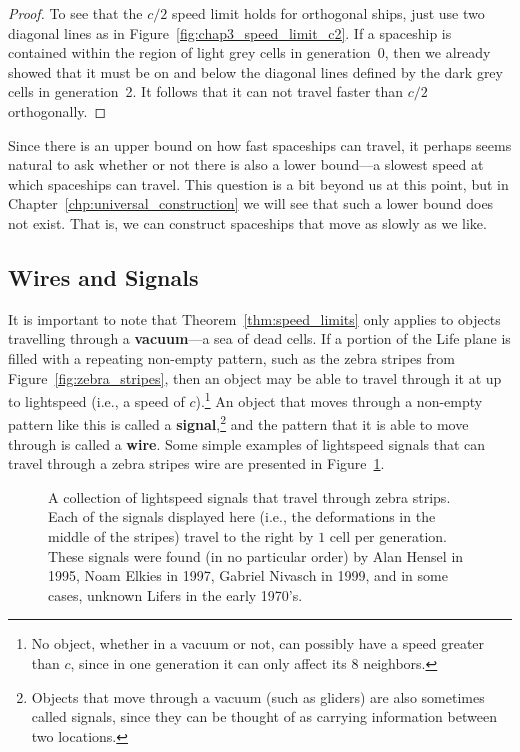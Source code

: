 \begin{proof}
	To see that the $c/2$ speed limit holds for orthogonal ships, just use two diagonal lines as in Figure~\ref{fig:chap3_speed_limit_c2}. If a spaceship is contained within the region of light grey cells in generation~0, then we already showed that it must be on and below the diagonal lines defined by the dark grey cells in generation~2. It follows that it can not travel faster than $c/2$ orthogonally.
\end{proof}

Since there is an upper bound on how fast spaceships can travel, it perhaps seems natural to ask whether or not there is also a lower bound---a slowest speed at which spaceships can travel. This question is a bit beyond us at this point, but in Chapter~\ref{chp:universal_construction} we will see that such a lower bound does not exist. That is, we can construct spaceships that move as slowly as we like.


\subsection{Wires and Signals}\label{sec:wires_signals}

It is important to note that Theorem~\ref{thm:speed_limits} only applies to objects travelling through a \textbf{vacuum}---a sea of dead cells. If a portion of the Life plane is filled with a repeating non-empty pattern, such as the zebra stripes from Figure~\ref{fig:zebra_stripes}, then an object may be able to travel through it at up to lightspeed (i.e., a speed of $c$).\footnote{No object, whether in a vacuum or not, can possibly have a speed greater than $c$, since in one generation it can only affect its $8$ neighbors.} An object that moves through a non-empty pattern like this is called a \textbf{signal},\footnote{Objects that move through a vacuum (such as gliders) are also sometimes called signals, since they can be thought of as carrying information between two locations.} and the pattern that it is able to move through is called a \textbf{wire}. Some simple examples of lightspeed signals that can travel through a zebra stripes wire are presented in Figure~\ref{fig:lightspeed_signals}.

\begin{figure}[!htb]
	\centering{}
	\caption{A collection of lightspeed signals that travel through zebra strips. Each of the signals displayed here (i.e., the deformations in the middle of the stripes) travel to the right by $1$ cell per generation. These signals were found (in no particular order) by Alan Hensel in 1995, Noam Elkies in 1997, Gabriel Nivasch in 1999, and in some cases, unknown Lifers in the early 1970's.}\label{fig:lightspeed_signals}
\end{figure}

